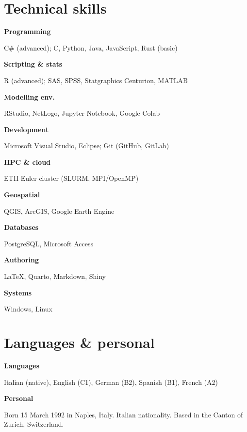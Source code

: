 \documentclass[10pt,a4paper]{article}
\newlength{\dcol}\setlength{\dcol}{3.5cm}
\newcommand{\defrow}[2]{%
  \noindent\begin{minipage}[t]{\dcol}\raggedright\footnotesize\bfseries\color{muted}#1\end{minipage}%
  \hspace{0.45cm}%
  \begin{minipage}[t]{\dimexpr\linewidth-\dcol-0.45cm\relax}\raggedright\small\color{inksoft}#2\end{minipage}\par\vspace{5pt}}
\begin{document}
\section*{Technical skills}
\defrow{Programming}{C\# (advanced); C, Python, Java, JavaScript, Rust (basic)}
\defrow{Scripting \& stats}{R (advanced); SAS, SPSS, Statgraphics Centurion, MATLAB}
\defrow{Modelling env.}{RStudio, NetLogo, Jupyter Notebook, Google Colab}
\defrow{Development}{Microsoft Visual Studio, Eclipse; Git (GitHub, GitLab)}
\defrow{HPC \& cloud}{ETH Euler cluster (SLURM, MPI/OpenMP)}
\defrow{Geospatial}{QGIS, ArcGIS, Google Earth Engine}
\defrow{Databases}{PostgreSQL, Microsoft Access}
\defrow{Authoring}{\LaTeX, Quarto, Markdown, Shiny}
\defrow{Systems}{Windows, Linux}

\section*{Languages \& personal}
\defrow{Languages}{Italian (native), English (C1), German (B2), Spanish (B1), French (A2)}
\defrow{Personal}{Born 15 March 1992 in Naples, Italy. Italian nationality. Based in the Canton of Zurich, Switzerland.}
\end{document}
